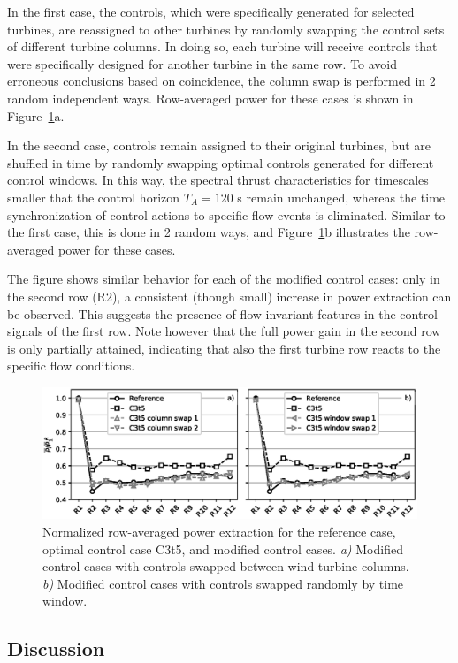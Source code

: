 \documentclass[wes, manuscript]{copernicus}
\begin{document}
In the first case, the controls, which were specifically generated for selected turbines, are reassigned to other turbines by randomly swapping the control sets of different turbine columns. In doing so, each turbine will receive controls that were specifically designed for another turbine in the same row. To avoid erroneous conclusions based on coincidence, the column swap is performed in 2 random independent ways. Row-averaged power for these cases is shown in Figure~\ref{fig:scrambled}a. 

In the second case, controls remain assigned to their original turbines, but are shuffled in time by randomly swapping optimal controls generated for different control windows. In this way, the spectral thrust characteristics for timescales smaller that the control horizon $T_A = 120$ s remain unchanged, whereas the time synchronization of control actions to specific flow events is eliminated. Similar to the first case, this is done in 2 random ways, and Figure~\ref{fig:scrambled}b illustrates the row-averaged power for these cases.

The figure shows similar behavior for each of the modified control cases: only in the second row (R2), a consistent (though small) increase in power extraction can be observed. This suggests the presence of flow-invariant	features in the control signals of the first row. Note however that the full power gain in the second row is only partially attained, indicating that also the first turbine row reacts to the specific flow conditions.  

\begin{figure}
	\includegraphics[width=\textwidth]{scrambled.eps}
	\caption{Normalized row-averaged power extraction for the reference case, optimal control case C3t5, and modified control cases. \emph{a)} Modified control cases with controls swapped between wind-turbine columns. \emph{b)} Modified control cases with controls swapped randomly by time window. \label{fig:scrambled}}
\end{figure}

\subsection{Discussion}\label{sec:analysis_discussion}
\end{document}
